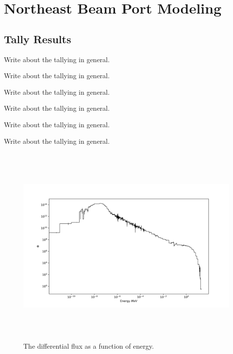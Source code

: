 
\cleardoublepage


\chapter{Northeast Beam Port Modeling}


\section{Tally Results}

Write about the tallying in general.

Write about the tallying in general.

Write about the tallying in general.

Write about the tallying in general.

Write about the tallying in general.

Write about the tallying in general.

\begin{figure}[htb]
\centering
\includegraphics[height=4in]{tex/figures/flux_erg.png}
\caption[Flux vs. Energy]{The differential flux as a function of energy.}
\label{fig:flux_erg}
\end{figure}

